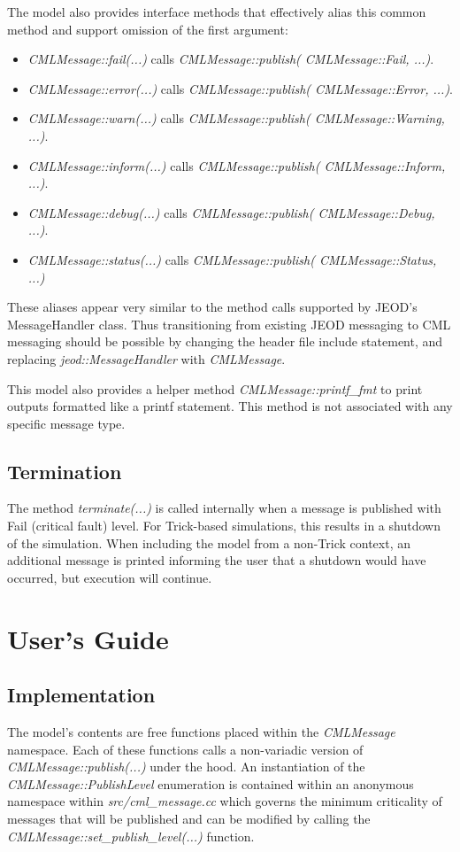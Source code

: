\documentclass[11pt,fleqn]{report}
\begin{document}
The model also provides interface methods that effectively alias this 
common method and support omission of the first argument:
\begin{itemize}
\item \textit{CMLMessage::fail(...)} calls
      \textit{CMLMessage::publish( CMLMessage::Fail, ...)}.
\item \textit{CMLMessage::error(...)} calls
      \textit{CMLMessage::publish( CMLMessage::Error, ...)}.
\item \textit{CMLMessage::warn(...)} calls
      \textit{CMLMessage::publish( CMLMessage::Warning, ...)}.
\item \textit{CMLMessage::inform(...)} calls
      \textit{CMLMessage::publish( CMLMessage::Inform, ...)}.
\item \textit{CMLMessage::debug(...)} calls
      \textit{CMLMessage::publish( CMLMessage::Debug, ...)}.
\item \textit{CMLMessage::status(...)} calls
      \textit{CMLMessage::publish( CMLMessage::Status, ...)}
\end{itemize}
These aliases appear very similar to the method calls supported by JEOD's
MessageHandler class. Thus transitioning from existing JEOD messaging to
CML messaging should be possible by changing the header file include
statement, and replacing \textit{jeod::MessageHandler} with \textit{CMLMessage}.

This model also provides a helper method \textit{CMLMessage::printf\_fmt} to print
outputs formatted like a printf statement. This method is not associated with any specific
message type.

\section {Termination}
The method \textit{terminate(...)} is called internally when a message is
published with Fail (critical fault) level. For Trick-based simulations, this
results in a shutdown of the simulation. When including the model from a non-Trick
context, an additional message is printed informing the user that a shutdown would have
occurred, but execution will continue.

\chapter {User's Guide}
\section {Implementation}
The model's contents are free functions placed within the \textit{CMLMessage}
namespace. Each of these functions calls a non-variadic version of
\textit{CMLMessage::publish(...)} under the hood. An instantiation of the
\textit{CMLMessage::PublishLevel} enumeration is contained within an anonymous
namespace within \textit{src/cml\_message.cc} which governs the minimum criticality
of messages that will be published and can be modified by calling the
\textit{CMLMessage::set\_publish\_level(...)} function.
\end{document}
